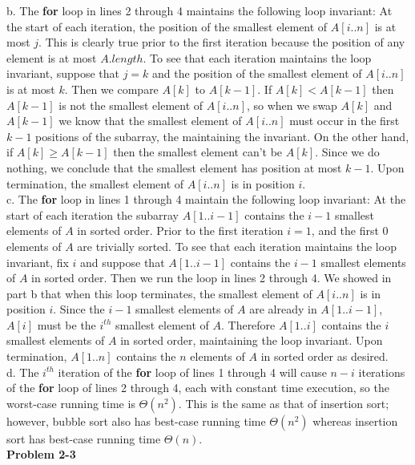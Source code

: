\documentclass{article}
\begin{document}
b. The \textbf{for} loop in lines 2 through 4 maintains the following loop invariant: At the start of each iteration, the position of the smallest element of $A[i..n]$ is at most $j$.  This is clearly true prior to the first iteration because the position of any element is at most $A.length$.  To see that each iteration maintains the loop invariant, suppose that $j=k$ and the position of the smallest element of $A[i..n]$ is at most $k$.  Then we compare $A[k]$ to $A[k-1]$.  If $A[k] < A[k-1]$ then $A[k-1]$ is not the smallest element of $A[i..n]$, so when we swap $A[k]$ and $A[k-1]$ we know that the smallest element of $A[i..n]$ must occur in the first $k-1$ positions of the subarray, the maintaining the invariant.  On the other hand, if $A[k] \geq A[k-1]$ then the smallest element can't be $A[k]$.  Since we do nothing, we conclude that the smallest element has position at most $k-1$.  Upon termination, the smallest element of $A[i..n]$ is in position $i$.  \\

c. The \textbf{for} loop in lines 1 through 4 maintain the following loop invariant:  At the start of each iteration the subarray $A[1..i-1]$ contains the $i-1$ smallest elements of $A$ in sorted order.  Prior to the first iteration $i=1$, and the first 0 elements of $A$ are trivially sorted.  To see that each iteration maintains the loop invariant, fix $i$ and suppose that $A[1..i-1]$ contains the $i-1$ smallest elements of $A$ in sorted order.  Then we run the loop in lines 2 through 4.  We showed in part b that when this loop terminates, the smallest element of $A[i..n]$ is in position $i$.  Since the $i-1$ smallest elements of $A$ are already in $A[1..i-1]$, $A[i]$ must be the $i^{th}$ smallest element of $A$.  Therefore $A[1..i]$ contains the $i$ smallest elements of $A$ in sorted order, maintaining the loop invariant.  Upon termination, $A[1..n]$ contains the $n$ elements of $A$ in sorted order as desired. \\

d. The $i^{th}$ iteration of the \textbf{for} loop of lines 1 through 4 will cause $n-i$ iterations of the \textbf{for} loop of lines 2 through 4, each with constant time execution, so the worst-case running time is $\Theta(n^2)$.  This is the same as that of insertion sort; however, bubble sort also has best-case running time $\Theta(n^2)$ whereas insertion sort has best-case running time $\Theta(n)$. \\


\noindent\textbf{Problem 2-3}\\
\end{document}

